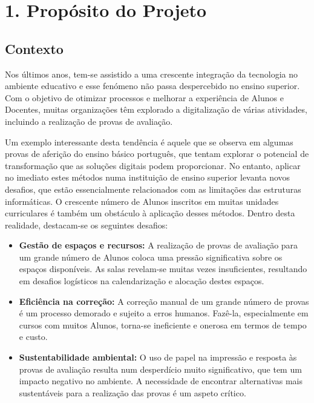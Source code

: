 \chapter*{1. Propósito do Projeto}

\section*{Contexto}




{\TextoCor
Nos últimos anos, tem-se assistido a uma crescente integração da tecnologia no ambiente educativo e esse fenómeno não passa despercebido no ensino superior. Com o objetivo de otimizar processos e melhorar a experiência de Alunos e Docentes, muitas organizações têm explorado a digitalização de várias atividades, incluindo a realização de provas de avaliação.

Um exemplo interessante desta tendência é aquele que se observa em algumas provas de aferição do ensino básico português, que tentam explorar o potencial de transformação que as soluções digitais podem proporcionar.
No entanto, aplicar no imediato estes métodos numa instituição de ensino superior levanta novos desafios, que estão essencialmente relacionados com as limitações das estruturas informáticas. O crescente número de Alunos inscritos em muitas unidades curriculares é também um obstáculo à aplicação desses métodos.
Dentro desta realidade, destacam-se os seguintes desafios:

\begin{itemize}
\item \textbf{Gestão de espaços e recursos:} A realização de provas de avaliação para um grande número de Alunos coloca uma pressão significativa sobre os espaços disponíveis. As salas revelam-se muitas vezes insuficientes, resultando em desafios logísticos na calendarização e alocação destes espaços.

\item \textbf{Eficiência na correção:} A correção manual de um grande número de provas é um processo demorado e sujeito a erros humanos. Fazê-la, especialmente em cursos com muitos Alunos, torna-se ineficiente e onerosa em termos de tempo e custo.

\item \textbf{Sustentabilidade ambiental:} O uso de papel na impressão e resposta às provas de avaliação resulta num desperdício muito significativo, que tem um impacto negativo no ambiente. A necessidade de encontrar alternativas mais sustentáveis para a realização das provas é um aspeto crítico.

\end{itemize}
}

